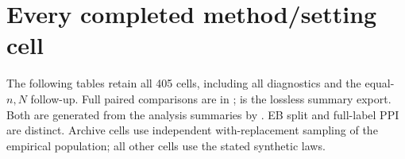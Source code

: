 \section{Every completed method/setting cell}\label{app:complete}
The following tables retain all 405 cells, including all diagnostics and the equal-$n,N$ follow-up. Full paired comparisons are in ;  is the lossless summary export. Both are generated from the analysis summaries by . EB split and full-label PPI are distinct. Archive cells use independent with-replacement sampling of the empirical population; all other cells use the stated synthetic laws.

\clearpage
